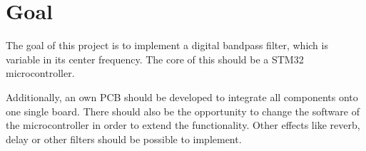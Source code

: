 \section{Goal}

The goal of this project is to implement a digital bandpass filter, which is variable in its center frequency.
The core of this should be a STM32 microcontroller.

Additionally, an own \ac{PCB} should be developed to integrate all components onto one single board.
There should also be the opportunity to change the software of the microcontroller in order to extend
the functionality. Other effects like reverb, delay or other filters should be possible to implement.

